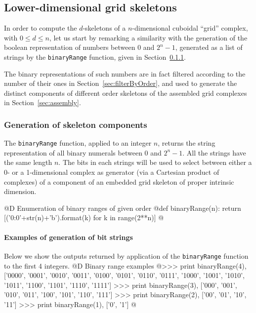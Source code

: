 \documentclass[11pt,oneside]{article}	%
\begin{document}
\subsection{Lower-dimensional grid skeletons}

In order to compute the $d$-skeletons of a $n$-dimensional cuboidal ``grid'' complex, with $0\leq d\leq n$, let us start by remarking a similarity with the generation of the boolean representation of numbers between 0 and $2^n -1$, generated as a list of strings by the \texttt{binaryRange} function, given in Section~\ref{sec:binaryRange}.

The binary representations of such numbers are in fact filtered according to the number of their ones in Section~\ref{sec:filterByOrder}, and used to generate the distinct components of different order skeletons of the assembled grid complexes in Section~\ref{sec:assembly}.

\subsubsection{Generation of skeleton components}
\label{sec:binaryRange}

The \texttt{binaryRange} function, applied to an integer $n$, returns the string representation of all binary numerals between 0 and $2^n -1$. All the strings have the same length $n$. The bits in each strings will be used to select between either a 0- or a 1-dimensional complex as generator (via a Cartesian product of complexes) of a component of an embedded grid skeleton of proper intrinsic dimension.

@D Enumeration of binary ranges of given order
@{def binaryRange(n):
    return [('{0:0'+str(n)+'b}').format(k) for k in range(2**n)]
@}

\paragraph{Examples of generation of bit strings}
Below we show the outputs returned by application of the \texttt{binaryRange} function to the first 4 integers.
@D Binary range examples 
@{>>> print binaryRange(4),
['0000', '0001', '0010', '0011', '0100', '0101', '0110', '0111', 
 '1000', '1001', '1010', '1011', '1100', '1101', '1110', '1111']
>>> print binaryRange(3),
['000', '001', '010', '011', '100', '101', '110', '111']
>>> print binaryRange(2),
['00', '01', '10', '11']
>>> print binaryRange(1),
['0', '1']
@}
\end{document}
